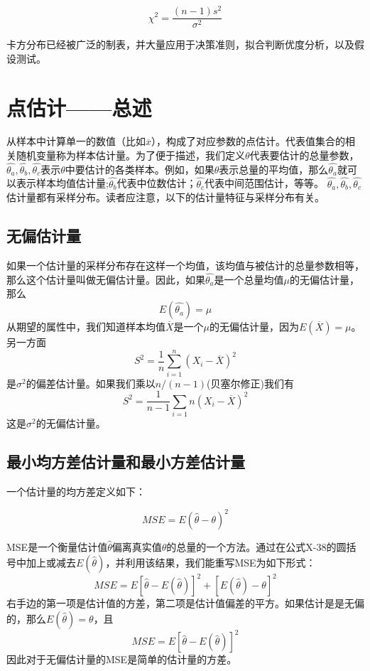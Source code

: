\documentclass[cn,11pt,chinese]{elegantbook}
\begin{document}
{$$\chi^2=\frac{(n-1)s^2}{\sigma^2}$$

卡方分布已经被广泛的制表，并大量应用于决策准则，拟合判断优度分析，以及假设测试。

\section{点估计——总述}

从样本中计算单一的数值（比如$\overline{x}$），构成了对应参数的点估计。代表值集合的相关随机变量称为样本估计量。为了便于描述，我们定义$\theta$代表要估计的总量参数，$\hat{\theta_a},\hat{\theta_b},\hat{\theta_c}$表示$\theta$中要估计的各类样本。例如，如果$\theta$表示总量的平均值，那么$\hat{\theta_a}$就可以表示样本均值估计量;$\hat{\theta_b}$代表中位数估计；$\hat{\theta_c}$代表中间范围估计，等等。
$\hat{\theta_a},\hat{\theta_b},\hat{\theta_c}$估计量都有采样分布。读者应注意，以下的估计量特征与采样分布有关。

\subsection{无偏估计量}

如果一个估计量的采样分布存在这样一个均值，该均值与被估计的总量参数相等，那么这个估计量叫做无偏估计量。因此，如果$\hat{\theta_a}$是一个总量均值$\mu$的无偏估计量，那么
$$E(\hat{\theta_a})=\mu$$
从期望的属性中，我们知道样本均值$\overline{X}$是一个$\mu$的无偏估计量，因为$E(\overline{X})=\mu$。另一方面
$$S^2=\frac{1}{n}\sum_{i=1}^{n}(X_i-\overline{X})^2$$
是$\sigma^2$的偏差估计量。如果我们乘以$n/(n-1)$(贝塞尔修正)我们有
$$S^2=\frac{1}{n-1}\sum_{i=1}{n}(X_i-\overline{X})^2$$
这是$\sigma^2$的无偏估计量。

\subsection{最小均方差估计量和最小方差估计量}

一个估计量的均方差定义如下：

\begin{equation}\label{eq10-38}
MSE=E(\hat{\theta}-\theta)^2 
\end{equation}

MSE是一个衡量估计值$\hat{\theta}$偏离真实值$\theta$的总量的一个方法。通过在公式X-38的圆括号中加上或减去$E(\hat{\theta})$，并利用该结果，我们能重写MSE为如下形式：
$$MSE=E[\hat{\theta}-E(\hat{\theta})]^2+[E(\hat{\theta})-\theta]^2$$
右手边的第一项是估计值的方差，第二项是估计值偏差的平方。如果估计是是无偏的，那么$E(\hat{\theta})=\theta$，且
$$MSE=E[\hat{\theta}-E(\hat{\theta})]^2$$
因此对于无偏估计量的MSE是简单的估计量的方差。

}
\end{document}

